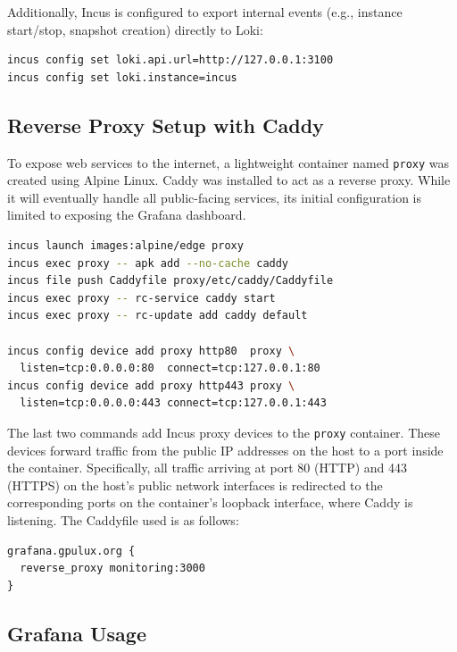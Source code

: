 Additionally, Incus is configured to export internal events (e.g., instance start/stop, snapshot creation) directly to Loki\cite{incus-loki-api}:

\begin{lstlisting}[language=bash]
incus config set loki.api.url=http://127.0.0.1:3100
incus config set loki.instance=incus
\end{lstlisting}

\subsection*{Reverse Proxy Setup with Caddy}

To expose web services to the internet, a lightweight container named \texttt{proxy} was created using Alpine Linux. Caddy was installed to act as a reverse proxy. While it will eventually handle all public-facing services, its initial configuration is limited to exposing the Grafana dashboard.

\begin{lstlisting}[language=bash,caption={Commands used to set up the Caddy reverse proxy container}]
incus launch images:alpine/edge proxy
incus exec proxy -- apk add --no-cache caddy
incus file push Caddyfile proxy/etc/caddy/Caddyfile
incus exec proxy -- rc-service caddy start
incus exec proxy -- rc-update add caddy default

incus config device add proxy http80  proxy \
  listen=tcp:0.0.0.0:80  connect=tcp:127.0.0.1:80
incus config device add proxy http443 proxy \
  listen=tcp:0.0.0.0:443 connect=tcp:127.0.0.1:443
\end{lstlisting}

The last two commands add Incus proxy devices\cite{incus-proxy-device} to the \texttt{proxy} container. These devices forward traffic from the public IP addresses on the host to a port inside the container. Specifically, all traffic arriving at port 80 (HTTP) and 443 (HTTPS) on the host's public network interfaces is redirected to the corresponding ports on the container's loopback interface, where Caddy is listening. The Caddyfile used is as follows:

\begin{lstlisting}[caption={Caddyfile configuration used to expose Grafana through the reverse proxy}]
grafana.gpulux.org {
  reverse_proxy monitoring:3000
}
\end{lstlisting}

\subsection*{Grafana Usage}

